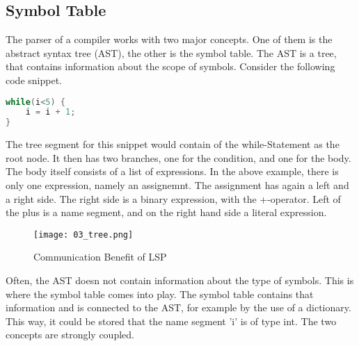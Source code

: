 \subsection{Symbol Table}
The parser of a compiler works with two major concepts. One of them is the abstract syntax tree (AST), the other is the symbol table. The AST is a tree, that contains information about the scope of symbols. Consider the following code snippet.

\begin{lstlisting}[language=csharp, caption={AST Demo Snippet}, captionpos=b, label={lst:astsnipped}]
while(i<5) {
    i = i + 1;
}
\end{lstlisting}

The tree segment for this snippet would contain of the while-Statement as the root node. It then has two branches, one for the condition, and one for the body. The body itself consists of a list of expressions. In the above example, there is only one expression, namely an assignemnt. The assignment has again a left and a right side. The right side is a binary expression, with the +-operator. Left of the plus is a name segment, and on the right hand side a literal expression.\\

\begin{figure}[h]
    \centering
    \texttt{[image: 03\_tree.png]}
    \caption{Communication Benefit of LSP}
    \label{fig:tree_for_example}
\end{figure}

Often, the AST doesn not contain information about the type of symbols. This is where the symbol table comes into play. The symbol table contains that information and is connected to the AST, for example by the use of a dictionary. This way, it could be stored that the name segment 'i' is of type int. The two concepts are strongly coupled.

